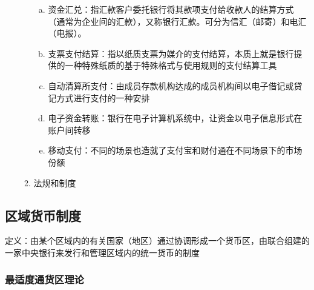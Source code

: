 \documentclass[12pt]{book}
\begin{document}
\begin{enumerate}[1.]
\begin{enumerate}[(1)]
\begin{enumerate}[a.]
            \item 资金汇兑：指汇款客户委托银行将其款项支付给收款人的结算方式（通常为企业间的汇款），又称银行汇款。可分为信汇（邮寄）和电汇（电报）。
            \item 支票支付结算：指以纸质支票为媒介的支付结算，本质上就是银行提供的一种特殊纸质的基于特殊格式与使用规则的支付结算工具
            \item 自动清算所支付：由成员存款机构达成的成员机构间以电子借记或贷记方式进行支付的一种安排
            \item 电子资金转账：银行在电子计算机系统中，让资金以电子信息形式在账户间转移
            \item 移动支付：不同的场景也造就了支付宝和财付通在不同场景下的市场份额
        \end{enumerate}
        \item 法规和制度
    \end{enumerate}
\end{enumerate}



\subsection{区域货币制度}

定义：由某个区域内的有关国家（地区）通过协调形成一个货币区，由联合组建的一家中央银行来发行和管理区域内的统一货币的制度



\subsubsection{最适度通货区理论}
\end{document}
